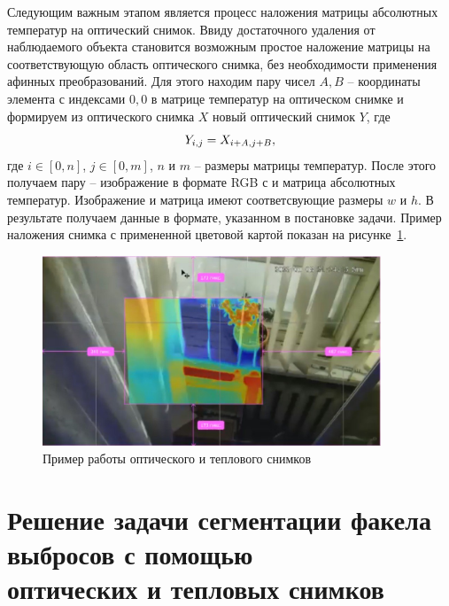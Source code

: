 \documentclass[14pt, a4paper]{extreport}
\begin{document}
	Следующим важным этапом является процесс наложения матрицы абсолютных температур на оптический снимок. Ввиду достаточного удаления от наблюдаемого объекта становится возможным простое наложение матрицы на соответствующую область оптического снимка, без необходимости применения афинных преобразований. 
	Для этого находим пару чисел $A, B$ -- координаты элемента с индексами $0, 0$ в матрице температур на оптическом снимке и формируем из оптического снимка $X$ новый оптический снимок $Y$, где
	\vspace*{-0.3cm}
	\begin{equation*}
		Y_{i,j} = X_{i + A,j + B},
		\label{eq:nalozhenie}
		\vspace*{-0.3cm}
	\end{equation*}
	где $i \in [0, n]$, $j \in [0, m]$, $n$ и $m$ -- размеры матрицы температур. После этого получаем пару -- изображение в формате RGB с и матрица абсолютных температур. Изображение и матрица имеют соответсвующие размеры $w$ и $h$. В результате получаем данные в формате, указанном в постановке задачи. Пример наложения снимка с примененной цветовой картой показан на рисунке~\ref{fig:nalozhenie_examp}.
	\begin{figure}[h!]
		\centering
		\includegraphics[width = 0.9\textwidth]{image/chapter_2/nalozhenie_examp}	
		\caption{Пример работы оптического и теплового снимков}
		\label{fig:nalozhenie_examp}
	\end{figure}
\section[\vspace*{-0.22cm}Решение задачи сегментации факела выбросов с помощью \\ \hspace*{-0.75cm}оптических и тепловых снимков]{\vspace*{-0.22cm}Решение задачи сегментации факела выбросов с помощью \\ \hspace*{-2.05cm}оптических и тепловых снимков}
\end{document}
